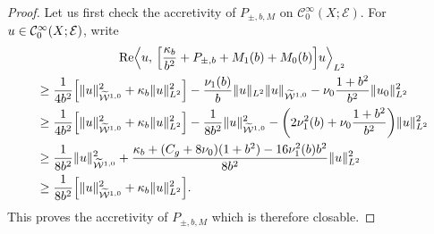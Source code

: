 \documentclass[10pt]{amsart}
\theoremstyle{definition}\newtheorem{defi}[theo]{Definition}\newtheorem{rema}[theo]{Remark}\newtheorem{exam}[theo]{Example}\newtheorem{exem}[theo]{Example}\newtheorem{nota}[theo]{Notation}
\newcommand{\clW}{\mathcal{W}}
\newcommand{\clC}{\mathcal{C}}
\newcommand{\clE}{\mathcal{E}}
\DeclareMathOperator{\Ree}{Re}
\let\originalleft\left
\let\originalright\right
\renewcommand{\left}{\mathopen{}\mathclose\bgroup\originalleft}
\renewcommand{\right}{\aftergroup\egroup\originalright}
\begin{document}
\begin{proof}
Let us first check the accretivity of $P_{\pm,b,M}$ on $\clC^{\infty}_{0}(X;\clE)$. For $u\in\linebreak \clC^{\infty}_{0}(X;\clE)$, write
\begin{multline*}
\Ree\left\langle u,\, \left[\frac{\kappa_{b}}{b^{2}}+P_{\pm,b}+M_{1}(b)+M_{0}(b)\right]u\right\rangle_{L^{2}}\\
\begin{aligned}
&\geq \frac{1}{4b^{2}}\left[\|u\|_{\widetilde{\clW}^{1,0}}^{2}+\kappa_{b}\|u\|_{L^{2}}^{2}\right] -\frac{\nu_{1}(b)}{b}\|u\|_{L^{2}}\|u\|_{\widetilde{\clW}^{1,0}} -\nu_{0}\frac{1+b^{2}}{b^{2}}\|u_{0}\|_{L^{2}}^{2}
\\
&\geq \frac{1}{4b^{2}}\left[\|u\|_{\widetilde{\clW}^{1,0}}^{2}+\kappa_{b}\|u\|_{L^{2}}^{2}\right] -\frac{1}{8b^{2}}\|u\|^{2}_{\widetilde{\clW}^{1,0}} -\left(2\nu_{1}^{2}(b)+\nu_{0}\frac{1+b^{2}}{b^{2}}\right)\|u\|_{L^{2}}^{2}
\\
&\geq \frac{1}{8b^{2}}\|u\|_{\widetilde{\clW}^{1,0}}^{2} +\frac{\kappa_{b}+(C_{g}+8\nu_{0})(1+b^{2})-16\nu_{1}^{2}(b)b^{2}}{8b^{2}}\|u\|_{L^{2}}^{2}\\ 
&\geq \frac{1}{8b^{2}}\left[\|u\|_{\widetilde{\clW}^{1,0}}^{2}+\kappa_{b}\|u\|_{L^{2}}^{2}\right].
\end{aligned}
\end{multline*}
This proves the accretivity of $P_{\pm,b,M}$ which is therefore closable.


\end{proof}
\end{document}
